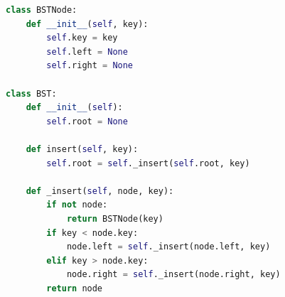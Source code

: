 \documentclass{article}
\begin{document}
\begin{multicols}{2}
\begin{tcolorbox}[colback=black,colframe=gray!50!,arc=3mm,boxrule=0pt,left=0pt,right=0pt,width=\linewidth]
			\begin{lstlisting}[language=Python]
class BSTNode:
	def __init__(self, key):
		self.key = key
		self.left = None
		self.right = None

class BST:
	def __init__(self):
		self.root = None

	def insert(self, key):
		self.root = self._insert(self.root, key)

	def _insert(self, node, key):
		if not node:
			return BSTNode(key)
		if key < node.key:
			node.left = self._insert(node.left, key)
		elif key > node.key:
			node.right = self._insert(node.right, key)
		return node
			\end{lstlisting}
			
		\end{tcolorbox}
	\end{multicols}
	
	\newpage
	
\end{document}
